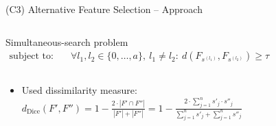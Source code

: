 \documentclass[en, navbarinline, handout]{sdqbeamer}
\begin{document}
\begin{frame}[t]{(C3) Alternative Feature Selection -- Approach}
\begin{columns}
\begin{greenblock}{Simultaneous-search problem}
\begin{equation*}
\begin{aligned}
					\text{subject to:} &\quad \forall l_1, l_2 \in \{0, \dots, a\},~l_1 \neq l_2:~d(F_{s^{(l_1)}},F_{s^{(l_2)}}) \geq \tau
				\end{aligned}
				\label{eq:afs:afs-simultaneous}
			\end{equation*}
		\end{greenblock}
	\end{columns}
	\pause
	\vspace{\baselineskip}
	\begin{itemize}
		\item Used dissimilarity measure: $d_{\text{Dice}}(F',F'') = 1 - \frac{2 \cdot |F' \cap F''|}{|F'| + |F''|} = 1 - \frac{2 \cdot \sum_{j=1}^n s'_j \cdot s''_j}{\sum_{j=1}^n s'_j + \sum_{j=1}^n s''_j}$
	\end{itemize}
\end{frame}
\end{document}
